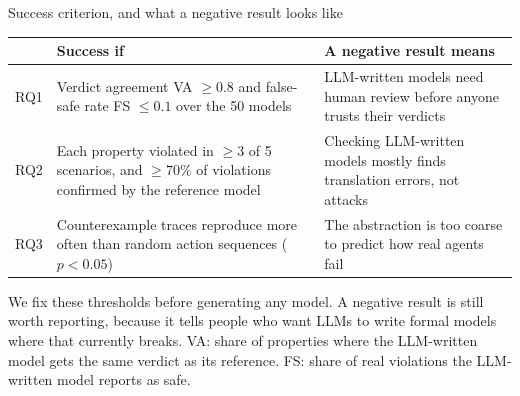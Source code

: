 \documentclass[aspectratio=169,11pt]{beamer}
\newcommand{\acro}[1]{\vfill{\color{muted}\scriptsize #1}}
\begin{document}
\begin{frame}{Success criterion, and what a negative result looks like}
\small
\renewcommand{\arraystretch}{1.4}
\begin{tabularx}{\textwidth}{@{}l>{\raggedright\arraybackslash}X>{\raggedright\arraybackslash}X@{}}
\toprule
 & \textbf{Success if} & \textbf{A negative result means} \\
\midrule
RQ1 & Verdict agreement VA $\geq 0.8$ and false-safe rate FS $\leq 0.1$ over the 50 models
    & LLM-written models need human review before anyone trusts their verdicts \\
RQ2 & Each property violated in $\geq 3$ of 5 scenarios, and $\geq 70\%$ of violations confirmed
      by the reference model
    & Checking LLM-written models mostly finds translation errors, not attacks \\
RQ3 & Counterexample traces reproduce more often than random action sequences ($p < 0.05$)
    & The abstraction is too coarse to predict how real agents fail \\
\bottomrule
\end{tabularx}

\vspace{0.6em}
We fix these thresholds before generating any model. A negative result is still worth reporting,
because it tells people who want LLMs to write formal models where that currently breaks.
\acro{VA: share of properties where the LLM-written model gets the same verdict as its reference.
FS: share of real violations the LLM-written model reports as safe.}
\end{frame}
\end{document}
